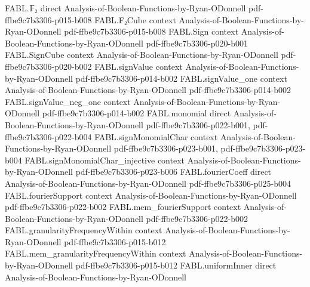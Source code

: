 \begin{theorem}
\label{FABL.oddWeightPartialSumProof_checks}
\leanok
{}
\proofstep
  {FABL.𝔽₂}
  {direct}
  {Analysis-of-Boolean-Functions-by-Ryan-ODonnell}
  {pdf-ffbe9c7b3306-p015-b008}
\proofstep
  {FABL.F₂Cube}
  {context}
  {Analysis-of-Boolean-Functions-by-Ryan-ODonnell}
  {pdf-ffbe9c7b3306-p015-b008}
\proofstep
  {FABL.Sign}
  {context}
  {Analysis-of-Boolean-Functions-by-Ryan-ODonnell}
  {pdf-ffbe9c7b3306-p020-b001}
\proofstep
  {FABL.SignCube}
  {context}
  {Analysis-of-Boolean-Functions-by-Ryan-ODonnell}
  {pdf-ffbe9c7b3306-p020-b002}
\proofstep
  {FABL.signValue}
  {context}
  {Analysis-of-Boolean-Functions-by-Ryan-ODonnell}
  {pdf-ffbe9c7b3306-p014-b002}
\proofstep
  {FABL.signValue_one}
  {context}
  {Analysis-of-Boolean-Functions-by-Ryan-ODonnell}
  {pdf-ffbe9c7b3306-p014-b002}
\proofstep
  {FABL.signValue_neg_one}
  {context}
  {Analysis-of-Boolean-Functions-by-Ryan-ODonnell}
  {pdf-ffbe9c7b3306-p014-b002}
\proofstep
  {FABL.monomial}
  {direct}
  {Analysis-of-Boolean-Functions-by-Ryan-ODonnell}
  {pdf-ffbe9c7b3306-p022-b001,
    pdf-ffbe9c7b3306-p022-b004}
\proofstep
  {FABL.signMonomialChar}
  {context}
  {Analysis-of-Boolean-Functions-by-Ryan-ODonnell}
  {pdf-ffbe9c7b3306-p023-b001,
    pdf-ffbe9c7b3306-p023-b004}
\proofstep
  {FABL.signMonomialChar_injective}
  {context}
  {Analysis-of-Boolean-Functions-by-Ryan-ODonnell}
  {pdf-ffbe9c7b3306-p023-b006}
\proofstep
  {FABL.fourierCoeff}
  {direct}
  {Analysis-of-Boolean-Functions-by-Ryan-ODonnell}
  {pdf-ffbe9c7b3306-p025-b004}
\proofstep
  {FABL.fourierSupport}
  {context}
  {Analysis-of-Boolean-Functions-by-Ryan-ODonnell}
  {pdf-ffbe9c7b3306-p022-b002}
\proofstep
  {FABL.mem_fourierSupport}
  {context}
  {Analysis-of-Boolean-Functions-by-Ryan-ODonnell}
  {pdf-ffbe9c7b3306-p022-b002}
\proofstep
  {FABL.granularityFrequencyWithin}
  {context}
  {Analysis-of-Boolean-Functions-by-Ryan-ODonnell}
  {pdf-ffbe9c7b3306-p015-b012}
\proofstep
  {FABL.mem_granularityFrequencyWithin}
  {context}
  {Analysis-of-Boolean-Functions-by-Ryan-ODonnell}
  {pdf-ffbe9c7b3306-p015-b012}
\proofstep
  {FABL.uniformInner}
  {direct}
  {Analysis-of-Boolean-Functions-by-Ryan-ODonnell}

\end{theorem}

